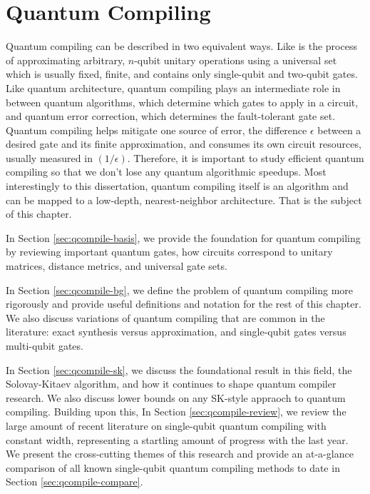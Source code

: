 \chapter{Quantum Compiling}
\label{chap:qcompile}

Quantum compiling can be described in two equivalent ways.
Like 
is the process of approximating arbitrary,
$n$-qubit unitary operations using a universal set which
is usually fixed, finite, and contains only single-qubit
and two-qubit gates. Like quantum architecture, quantum
compiling plays an intermediate role in between quantum
algorithms, which determine which gates to apply in a circuit,
and quantum error correction, which determines the
fault-tolerant gate set.
Quantum compiling helps mitigate one source of error,
the difference $\epsilon$ between a desired gate and its
finite approximation,
and consumes its own circuit resources, usually measured in
$(1 / \epsilon)$.
Therefore, it is important to study efficient quantum 
compiling so that we don't lose any quantum algorithmic speedups.
Most interestingly to this dissertation, quantum compiling itself
is an algorithm and can be mapped to a low-depth, nearest-neighbor
architecture. That is the subject of this chapter.

In Section \ref{sec:qcompile-basis}, we provide the foundation
for quantum compiling by reviewing important quantum gates,
how circuits correspond to unitary matrices, distance metrics,
and universal gate sets.

In Section \ref{sec:qcompile-bg}, we define the problem of
quantum compiling more rigorously and provide useful definitions
and notation for the rest of this chapter. We also discuss
variations of quantum compiling that are common in the
literature: exact synthesis versus approximation, and
single-qubit gates versus multi-qubit gates.

In Section \ref{sec:qcompile-sk}, we discuss the foundational
result in this field, the Solovay-Kitaev algorithm, and how it
continues to shape quantum compiler research. We also discuss
lower bounds on any SK-style appraoch to quantum compiling.
Building upon this,
In Section \ref{sec:qcompile-review}, we review the large
amount of recent literature on single-qubit quantum compiling with
constant width, representing
a startling amount of progress with the last year. We present
the cross-cutting themes of this research and provide an
at-a-glance comparison of all known single-qubit quantum compiling methods
to date in Section \ref{sec:qcompile-compare}.

